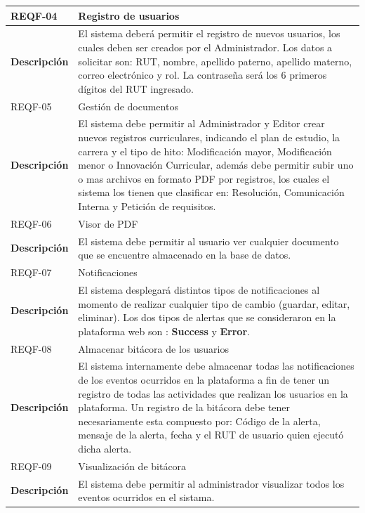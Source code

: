 \begin{longtable}{l |p{11cm}}
		\rowcolor{LightBlue2} REQF-04 & Registro de usuarios\\ \hline
		\textbf{Descripción} & El sistema deberá permitir el registro de nuevos usuarios, los cuales deben ser creados por el Administrador. Los datos a solicitar son: RUT, nombre, apellido paterno, apellido materno, correo electrónico y rol. La contraseña será los 6 primeros dígitos del  RUT ingresado.\\ \hline
		
		\rowcolor{LightBlue2} REQF-05 & Gestión de documentos\\  \hline
		\textbf{Descripción} & El sistema debe permitir al Administrador y Editor crear nuevos registros curriculares, indicando el plan de estudio, la carrera y el tipo de hito: Modificación mayor, Modificación menor o Innovación Curricular, además  debe permitir subir uno o mas archivos en formato PDF por registros, los cuales el sistema los  tienen que clasificar en: Resolución, Comunicación Interna y Petición de requisitos.\\  \hline
		
		\rowcolor{LightBlue2} REQF-06 & Visor de PDF\\  \hline
		\textbf{Descripción} & El sistema debe permitir al usuario ver  cualquier documento que se encuentre almacenado en la base de datos.\\  \hline \hline
		
		
		\rowcolor{LightBlue2} REQF-07 & Notificaciones\\  \hline
		\textbf{Descripción} & El sistema desplegará distintos tipos de notificaciones al momento de realizar cualquier tipo de cambio (guardar, editar, eliminar). Los dos tipos de alertas que se consideraron en la plataforma web son : \textbf{Success} y \textbf{Error}. \\  \hline \hline
		
		\rowcolor{LightBlue2} REQF-08 & Almacenar bitácora de los usuarios\\  \hline
		\textbf{Descripción} & El sistema internamente debe almacenar todas las notificaciones de los eventos ocurridos en la plataforma a fin de tener un registro de  todas  las actividades  que realizan los usuarios en la plataforma. Un registro de la bitácora debe tener necesariamente esta compuesto por: Código de la alerta, mensaje de la alerta, fecha y el RUT de usuario quien ejecutó dicha alerta.\\  \hline
		
		\rowcolor{LightBlue2} REQF-09 & Visualización de bitácora\\  \hline
		\textbf{Descripción} & El sistema debe permitir al administrador visualizar todos los eventos ocurridos en el sistama.\\ 
	
	\end{longtable}

